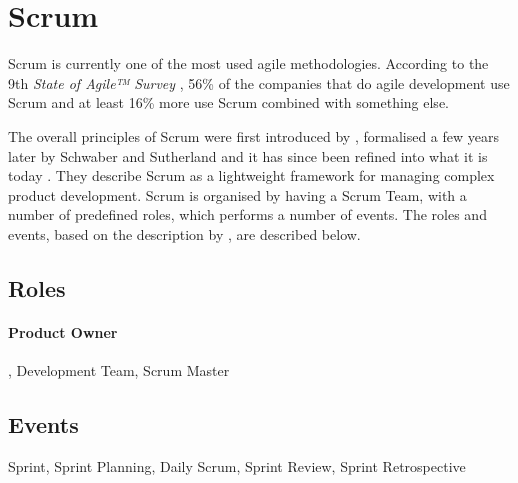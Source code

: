 
\section{Scrum}
Scrum is currently one of the most used agile methodologies. According to the 9th \textit{State of Agile™ Survey} \citep{VersionOne}, 56\% of the companies that do agile development use Scrum and at least 16\% more use Scrum combined with something else.

The overall principles of Scrum were first introduced by \citet{Takeuchi1986}, formalised a few years later by Schwaber and Sutherland and it has since been refined into what it is today \citep{Schwaber}. They describe Scrum as a lightweight framework for managing complex product development. Scrum is organised by having a Scrum Team, with a number of predefined roles, which performs a number of events. The roles and events, based on the description by \citet{Schwaber}, are described below.

\subsection{Roles}
\paragraph{Product Owner} , Development Team, Scrum Master

\subsection{Events}
Sprint, Sprint Planning, Daily Scrum, Sprint Review, Sprint Retrospective